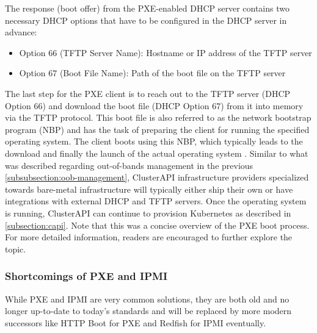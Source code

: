     \noindent The response (boot offer) from the PXE-enabled DHCP server contains two necessary DHCP options that have to be configured in the DHCP server in advance: 

    \begin{itemize}
        \item Option 66 (TFTP Server Name): Hostname or IP address of the TFTP server
        \item Option 67 (Boot File Name): Path of the boot file on the TFTP server
    \end{itemize}

    \noindent The last step for the PXE client is to reach out to the TFTP server (DHCP Option 66) and download the boot file (DHCP Option 67) from it into memory via the TFTP protocol. This boot file is also referred to as the network bootstrap program (NBP) and has the task of preparing the client for running the specified operating system. The client boots using this NBP, which typically leads to the download and finally the launch of the actual operating system \cite{paragon_software_pc_deployment}. Similar to what was described regarding out-of-bands management in the previous \autoref{subsubsection:oob-management}, ClusterAPI infrastructure providers specialized towards bare-metal infrastructure will typically either ship their own or have integrations with external DHCP and TFTP servers. Once the operating system is running, ClusterAPI can continue to provision Kubernetes as described in \autoref{subsection:capi}. Note that this was a concise overview of the PXE boot process. For more detailed information, readers are encouraged to further explore the topic.

    \subsubsection{Shortcomings of PXE and IPMI}
    While PXE and IPMI are very common solutions, they are both old and no longer up-to-date to today's standards and will be replaced by more modern successors like HTTP Boot for PXE and Redfish for IPMI eventually. \newline

